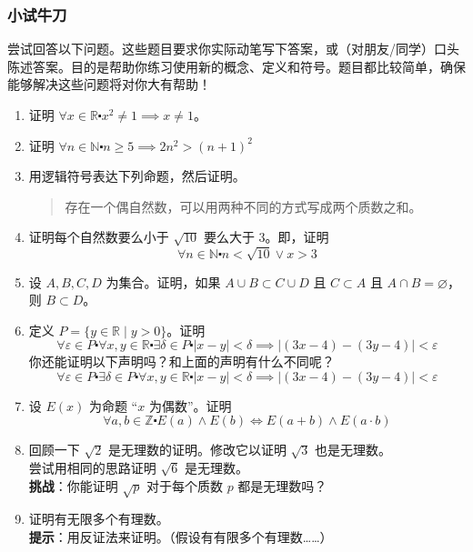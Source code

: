 \subsubsection*{小试牛刀}

尝试回答以下问题。这些题目要求你实际动笔写下答案，或（对朋友/同学）口头陈述答案。目的是帮助你练习使用新的概念、定义和符号。题目都比较简单，确保能够解决这些问题将对你大有帮助！

\begin{enumerate}[label=(\arabic*)]
    \item 证明 $\forall x \in \mathbb{R} \centerdot x^2 \ne 1 \implies x \ne 1$。
    \item 证明 $\forall n \in \mathbb{N} \centerdot n \ge 5 \implies 2n^2 > (n+1)^2$ \label{exc:exercises4.9.2}
    \item 用逻辑符号表达下列命题，然后证明。
        \begin{quote}
            存在一个偶自然数，可以用两种不同的方式写成两个质数之和。
        \end{quote}
    \item 证明每个自然数要么小于 $\sqrt{10}$ 要么大于 $3$。即，证明
        \[\forall n \in \mathbb{N} \centerdot n<\sqrt{10} \lor x>3\]
    \item 设 $A,B,C,D$ 为集合。证明，如果 $A \cup B \subset C \cup D$ 且 $C \subset A$ 且 $A \cap B = \varnothing$，则 $B \subset D$。
    \item 定义 $P = \{y \in \mathbb{R} \mid y > 0\}$。证明
        \[\forall \varepsilon \in P \centerdot \forall x, y \in \mathbb{R} \centerdot \exists \delta \in P \centerdot |x - y| < \delta \implies |(3x - 4) - (3y - 4)| < \varepsilon\]
        你还能证明以下声明吗？和上面的声明有什么不同呢？
        \[\forall \varepsilon \in P \centerdot \exists \delta \in P \centerdot \forall x, y \in \mathbb{R} \centerdot  |x - y| < \delta \implies |(3x - 4) - (3y - 4)| < \varepsilon\]
    \item 设 $E(x)$ 为命题 ``$x$ 为偶数''。证明
        \[\forall a, b \in \mathbb{Z} \centerdot E(a) \land E(b) \iff E(a + b) \land E(a \cdot b)\]
    \item 回顾一下 $\sqrt{2}$ 是无理数的证明。修改它以证明 $\sqrt{3}$ 也是无理数。\\
        尝试用相同的思路证明 $\sqrt{6}$ 是无理数。\\
        \textbf{挑战}：你能证明 $\sqrt{p}$ 对于每个质数 $p$ 都是无理数吗？
    \item 证明有无限多个有理数。\\
        \textbf{提示}：用反证法来证明。（假设有有限多个有理数……）
\end{enumerate}